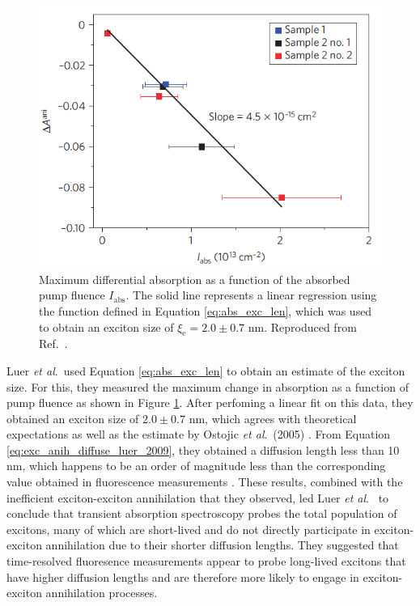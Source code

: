 \begin{figure}[ht]
	\centering
	\includegraphics[scale=0.8]{images/chapter_prior_works/exciton_size_fit_luer_2009}
	\caption{Maximum differential absorption as a function of the absorbed pump fluence $I_\text{abs}$. The solid line represents a linear regression using the function defined in Equation \eqref{eq:abs_exc_len}, which was used to obtain an exciton size of $\xi_\text{e} = 2.0 \pm 0.7$ nm. Reproduced from Ref.\ \cite{luer2009size}.}
	\label{fig:lin_fit_luer_2009}
\end{figure}

Luer \textit{et al}.\ used Equation \eqref{eq:abs_exc_len} to obtain an estimate of the exciton size. For this, they measured the maximum change in absorption as a function of pump fluence as shown in Figure \ref{fig:lin_fit_luer_2009}. After perfoming a linear fit on this data, they obtained an exciton size of $2.0 \pm 0.7$ nm, which agrees with theoretical expectations \cite{spataru2004excitonic, chang2004excitons, tretiak2007excitons} as well as the estimate by Ostojic \textit{et al}.\ (2005) \cite{ostojic2005stability}. From Equation \eqref{eq:exc_anih_diffuse_luer_2009}, they obtained a diffusion length less than 10 nm, which happens to be an order of magnitude less than the corresponding value obtained in fluorescence measurements \cite{cognet2007stepwise}. These results, combined with the inefficient exciton-exciton annihilation that they observed, led Luer \textit{et al}.\ \cite{luer2009size} to conclude that transient absorption spectroscopy probes the total population of excitons, many of which are short-lived and do not directly participate in exciton-exciton annihilation due to their shorter diffusion lengths. They suggested that time-resolved fluoresence measurements appear to probe long-lived excitons that have higher diffusion lengths and are therefore more likely to engage in exciton-exciton annihilation processes.

